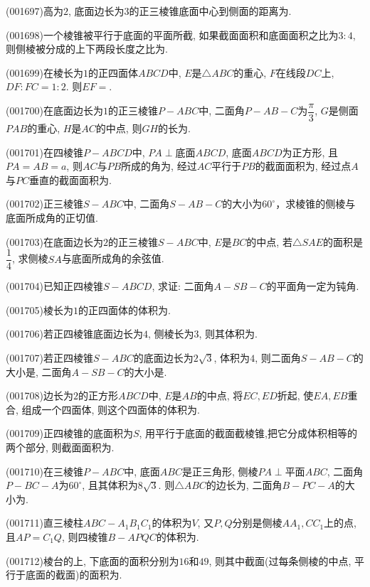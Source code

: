 \item (001697)高为$2$, 底面边长为$3$的正三棱锥底面中心到侧面的距离为.
\item (001698)一个棱锥被平行于底面的平面所截, 如果截面面积和底面面积之比为$3:4$, 则侧棱被分成的上下两段长度之比为.
\item (001699)在棱长为$1$的正四面体$ABCD$中, $E$是$\triangle ABC$的重心, $F$在线段$DC$上, $DF:FC=1:2$. 则$EF=$.
\item (001700)在底面边长为$1$的正三棱锥$P-ABC$中, 二面角$P-AB-C$为$\dfrac{\pi}{3}$, $G$是侧面$PAB$的重心, $H$是$AC$的中点, 则$GH$的长为.
\item (001701)在四棱锥$P-ABCD$中, $PA\perp $底面$ABCD$, 底面$ABCD$为正方形, 且$PA=AB=a$, 则$AC$与$PB$所成的角为, 经过$AC$平行于$PB$的截面面积为, 经过点$A$与$PC$垂直的截面面积为.
\item (001702)正三棱锥$S-ABC$中, 二面角$S-AB-C$的大小为$60^\circ$，求棱锥的侧棱与底面所成角的正切值.
\item (001703)在底面边长为$2$的正三棱锥$S-ABC$中, $E$是$BC$的中点, 若$\triangle SAE$的面积是$\dfrac{1}{4}$, 求侧棱$SA$与底面所成角的余弦值.
\item (001704)已知正四棱锥$S-ABCD$, 求证: 二面角$A-SB-C$的平面角一定为钝角.
\item (001705)棱长为$1$的正四面体的体积为.
\item (001706)若正四棱锥底面边长为$4$, 侧棱长为$3$, 则其体积为.
\item (001707)若正四棱锥$S-ABC$的底面边长为$2\sqrt{3}$, 体积为$4$, 则二面角$S-AB-C$的大小是, 二面角$A-SB-C$的大小是.
\item (001708)边长为$2$的正方形$ABCD$中, $E$是$AB$的中点, 将$EC,ED$折起, 使$EA,EB$重合, 组成一个四面体, 则这个四面体的体积为.
\item (001709)正四棱锥的底面积为$S$, 用平行于底面的截面截棱锥,把它分成体积相等的两个部分, 则截面面积为.
\item (001710)在三棱锥$P-ABC$中, 底面$ABC$是正三角形, 侧棱$PA\perp$平面$ABC$, 二面角$P-BC-A$为$60^\circ$, 且其体积为$8\sqrt{3}$. 则$\triangle ABC$的边长为, 二面角$B-PC-A$的大小为.
\item (001711)直三棱柱$ABC-A_1B_1C_1$的体积为$V$, 又$P,Q$分别是侧棱$AA_1,CC_1$上的点, 且$AP=C_1Q$, 则四棱锥$B-APQC$的体积为.
\item (001712)棱台的上, 下底面的面积分别为$16$和$49$, 则其中截面(过每条侧棱的中点, 平行于底面的截面)的面积为.
